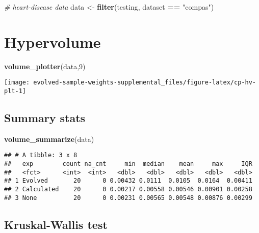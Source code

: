 \documentclass[
]{book}
\newenvironment{Shaded}{\begin{snugshade}}{\end{snugshade}}
\newcommand{\CommentTok}[1]{\textcolor[rgb]{0.56,0.35,0.01}{\textit{#1}}}
\newcommand{\DecValTok}[1]{\textcolor[rgb]{0.00,0.00,0.81}{#1}}
\newcommand{\FunctionTok}[1]{\textcolor[rgb]{0.13,0.29,0.53}{\textbf{#1}}}
\newcommand{\NormalTok}[1]{#1}
\newcommand{\OtherTok}[1]{\textcolor[rgb]{0.56,0.35,0.01}{#1}}
\newcommand{\SpecialCharTok}[1]{\textcolor[rgb]{0.81,0.36,0.00}{\textbf{#1}}}
\newcommand{\StringTok}[1]{\textcolor[rgb]{0.31,0.60,0.02}{#1}}
\begin{document}
\begin{Shaded}
\begin{Highlighting}[]
\CommentTok{\# heart{-}disease data}
\NormalTok{data }\OtherTok{\textless{}{-}} \FunctionTok{filter}\NormalTok{(testing, dataset }\SpecialCharTok{==} \StringTok{"compas"}\NormalTok{)}
\end{Highlighting}
\end{Shaded}

\hypertarget{hypervolume-8}{%
\section{Hypervolume}\label{hypervolume-8}}

\begin{Shaded}
\begin{Highlighting}[]
\FunctionTok{volume\_plotter}\NormalTok{(data,}\DecValTok{9}\NormalTok{)}
\end{Highlighting}
\end{Shaded}

\texttt{[image: evolved-sample-weights-supplemental\_files/figure-latex/cp-hv-plt-1]}

\hypertarget{summary-stats-8}{%
\subsection{Summary stats}\label{summary-stats-8}}

\begin{Shaded}
\begin{Highlighting}[]
\FunctionTok{volume\_summarize}\NormalTok{(data)}
\end{Highlighting}
\end{Shaded}

\begin{verbatim}
## # A tibble: 3 x 8
##   exp        count na_cnt     min  median    mean     max     IQR
##   <fct>      <int>  <int>   <dbl>   <dbl>   <dbl>   <dbl>   <dbl>
## 1 Evolved       20      0 0.00432 0.0111  0.0105  0.0164  0.00411
## 2 Calculated    20      0 0.00217 0.00558 0.00546 0.00901 0.00258
## 3 None          20      0 0.00231 0.00565 0.00548 0.00876 0.00299
\end{verbatim}

\hypertarget{kruskal-wallis-test-8}{%
\subsection{Kruskal-Wallis test}\label{kruskal-wallis-test-8}}
\end{document}
